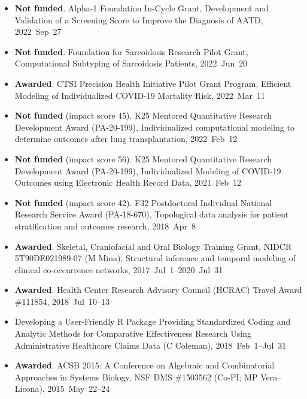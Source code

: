 \documentclass[10pt,a4paper]{article}
\begin{document}
\begin{itemize}[label=$\circ$,nolistsep]
\item
{\bfseries Not funded}.
Alpha-1 Foundation In-Cycle Grant, Development and Validation of a Screening Score to Improve the Diagnosis of AATD, 2022~Sep~27
\item
{\bfseries Not funded}.
Foundation for Sarcoidosis Research Pilot Grant, Computational Subtyping of Sarcoidosis Patients, 2022~Jun~20
\item
{\bfseries Awarded}.
CTSI Precision Health Initiative Pilot Grant Program, Efficient Modeling of Individualized COVID-19 Mortality Risk, 2022~Mar~11
\item
{\bfseries Not funded} (impact score 45).
K25 Mentored Quantitative Research Development Award (PA-20-199), Individualized computational modeling to determine outcomes after lung transplantation, 2022~Feb~12
\item
{\bfseries Not funded} (impact score 56).
K25 Mentored Quantitative Research Development Award (PA-20-199), Individualized Modeling of COVID-19 Outcomes using Electronic Health Record Data, 2021~Feb~12
\item
{\bfseries Not funded} (impact score 42).
F32 Postdoctoral Individual National Research Service Award (PA-18-670), Topological data analysis for patient stratification and outcomes
research, 2018~Apr~8
\item
{\bfseries Awarded}.
Skeletal, Craniofacial and Oral Biology Training Grant, NIDCR 5T90DE021989-07 (M Mina), Structural inference and temporal modeling of clinical co-occurrence networks, 2017~Jul~1--2020~Jul~31
\item
{\bfseries Awarded}.
Health Center Research Advisory Council (HCRAC) Travel Award \#111854, 2018~Jul~10--13
\item
Developing a User-Friendly R Package Providing Standardized Coding and Analytic Methods for Comparative Effectiveness Research Using Administrative Healthcare Claims Data (C Coleman), 2018~Feb~1--Jul~31
\item
{\bfseries Awarded}.
ACSB 2015: A Conference on Algebraic and Combinatorial Approaches in Systems Biology, NSF DMS \#1503562 (Co-PI; MP Vera--Licona), 2015~May~22--24
\end{itemize}
\end{document}
